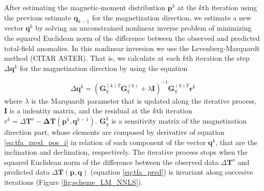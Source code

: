After estimating the magnetic-moment distribution $\mathbf{p}^k$ at the $k$th iteration using the previous estimate $\mathbf{q}_{k-1}$ for the magnetization direction, we estimate a new vector $\mathbf{q}^{k}$ by solving an unconstrained nonlinear inverse problem of minimizing the squared Euclidean norm of the difference between the observed and predicted total-field anomalies. In this nonlinear inversion we use the Levenberg-Marquardt method (CITAR ASTER). That is, we calculate at each $k$th iteration the step $\Delta \mathbf{q}^k$ for the magnetization direction by using the equation

\begin{equation}
	\Delta \mathbf{q}^k = (\mathbf{G}_{q}^{(k)T} \mathbf{G}_{q}^{(k)} + \lambda \mathbf{I})^{-1} \mathbf{G}_{q}^{(k)T}  \mathbf{r}^k
	\label{eq:linsys_q}
\end{equation}
where $\lambda$ is the Marquardt parameter that is updated along the iterative process, $\mathbf{I}$ is a indentity matrix, and  the residual at the $k$th iteration $r^k = \Delta \mathbf{T}^o - \mathbf{\Delta T} (\mathbf{p}^k, \mathbf{q}^{k-1})$. $\mathbf{G}_q^k$ is a sensitivity matrix of the magnetization direction part, whose elements are composed by derivative of equation \ref{eq:tfa_pred_pos_i} in relation of each component of the vector $\mathbf{q}^k$, that are the inclination and declination, respectively. The iterative process stops when the squared Euclidean norm of the difference between the observed data $\Delta \mathbf{T}^{o}$ and predicted data $\Delta\mathbf{T}(\mathbf{p}, \mathbf{q})$ (equation \ref{eq:tfa_pred}) is invariant along succesive iterations (Figure \ref{fig:scheme_LM_NNLS}).


